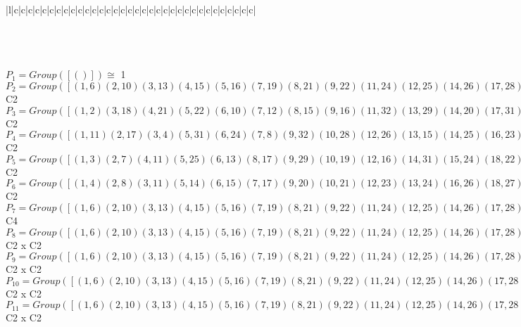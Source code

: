 \documentclass[varwidth=\maxdimen,border=10]{standalone}
\begin{document}
\begin{tabular}
\begin{array}{|l|c|c|c|c|c|c|c|c|c|c|c|c|c|c|c|c|c|c|c|c|c|c|c|c|c|c|c|c|c|c|c|c|c|c|}
\end{array}\)\\
\ \\
\ \\
$P_{1} = Group( [ () ] )\cong$ 1\ \\
$P_{2} = Group( [ ( 1, 6)( 2,10)( 3,13)( 4,15)( 5,16)( 7,19)( 8,21)( 9,22)(11,24)(12,25)(14,26)(17,28)(18,29)(20,30)(23,31)(27,32) ] )\cong$ C2\ \\
$P_{3} = Group( [ ( 1, 2)( 3,18)( 4,21)( 5,22)( 6,10)( 7,12)( 8,15)( 9,16)(11,32)(13,29)(14,20)(17,31)(19,25)(23,28)(24,27)(26,30) ] )\cong$ C2\ \\
$P_{4} = Group( [ ( 1,11)( 2,17)( 3, 4)( 5,31)( 6,24)( 7, 8)( 9,32)(10,28)(12,26)(13,15)(14,25)(16,23)(18,30)(19,21)(20,29)(22,27) ] )\cong$ C2\ \\
$P_{5} = Group( [ ( 1, 3)( 2, 7)( 4,11)( 5,25)( 6,13)( 8,17)( 9,29)(10,19)(12,16)(14,31)(15,24)(18,22)(20,32)(21,28)(23,26)(27,30) ] )\cong$ C2\ \\
$P_{6} = Group( [ ( 1, 4)( 2, 8)( 3,11)( 5,14)( 6,15)( 7,17)( 9,20)(10,21)(12,23)(13,24)(16,26)(18,27)(19,28)(22,30)(25,31)(29,32) ] )\cong$ C2\ \\
$P_{7} = Group( [ ( 1, 6)( 2,10)( 3,13)( 4,15)( 5,16)( 7,19)( 8,21)( 9,22)(11,24)(12,25)(14,26)(17,28)(18,29)(20,30)(23,31)(27,32), ( 1,14, 6,26)( 2,20,10,30)( 3,23,13,31)( 4, 5,15,16)( 7,27,19,32)( 8, 9,21,22)(11,12,24,25)(17,18,28,29) ] )\cong$ C4\ \\
$P_{8} = Group( [ ( 1, 6)( 2,10)( 3,13)( 4,15)( 5,16)( 7,19)( 8,21)( 9,22)(11,24)(12,25)(14,26)(17,28)(18,29)(20,30)(23,31)(27,32), ( 1, 3)( 2, 7)( 4,11)( 5,25)( 6,13)( 8,17)( 9,29)(10,19)(12,16)(14,31)(15,24)(18,22)(20,32)(21,28)(23,26)(27,30) ] )\cong$ C2 x C2\ \\
$P_{9} = Group( [ ( 1, 6)( 2,10)( 3,13)( 4,15)( 5,16)( 7,19)( 8,21)( 9,22)(11,24)(12,25)(14,26)(17,28)(18,29)(20,30)(23,31)(27,32), ( 1, 4)( 2, 8)( 3,11)( 5,14)( 6,15)( 7,17)( 9,20)(10,21)(12,23)(13,24)(16,26)(18,27)(19,28)(22,30)(25,31)(29,32) ] )\cong$ C2 x C2\ \\
$P_{10} = Group( [ ( 1, 6)( 2,10)( 3,13)( 4,15)( 5,16)( 7,19)( 8,21)( 9,22)(11,24)(12,25)(14,26)(17,28)(18,29)(20,30)(23,31)(27,32), ( 1,11)( 2,17)( 3, 4)( 5,31)( 6,24)( 7, 8)( 9,32)(10,28)(12,26)(13,15)(14,25)(16,23)(18,30)(19,21)(20,29)(22,27) ] )\cong$ C2 x C2\ \\
$P_{11} = Group( [ ( 1, 6)( 2,10)( 3,13)( 4,15)( 5,16)( 7,19)( 8,21)( 9,22)(11,24)(12,25)(14,26)(17,28)(18,29)(20,30)(23,31)(27,32), ( 1, 2)( 3,18)( 4,21)( 5,22)( 6,10)( 7,12)( 8,15)( 9,16)(11,32)(13,29)(14,20)(17,31)(19,25)(23,28)(24,27)(26,30) ] )\cong$ C2 x C2\ \\

\end{tabular}
\end{document}
